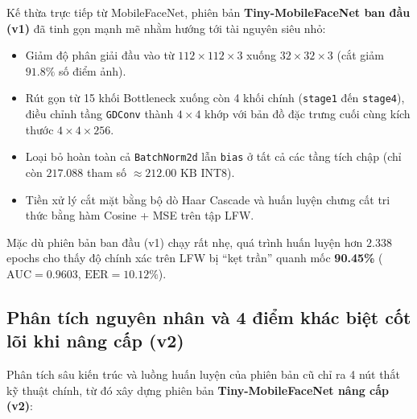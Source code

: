 \documentclass[11pt,a4paper]{article}
\begin{document}
Kế thừa trực tiếp từ MobileFaceNet, phiên bản \textbf{Tiny-MobileFaceNet ban đầu (v1)} đã tinh gọn mạnh mẽ nhằm hướng tới tài nguyên siêu nhỏ:
\begin{itemize}
    \item Giảm độ phân giải đầu vào từ $112 \times 112 \times 3$ xuống $32 \times 32 \times 3$ (cắt giảm $91.8\%$ số điểm ảnh).
    \item Rút gọn từ 15 khối Bottleneck xuống còn 4 khối chính (\texttt{stage1} đến \texttt{stage4}), điều chỉnh tầng \texttt{GDConv} thành $4 \times 4$ khớp với bản đồ đặc trưng cuối cùng kích thước $4 \times 4 \times 256$.
    \item Loại bỏ hoàn toàn cả \texttt{BatchNorm2d} lẫn \texttt{bias} ở tất cả các tầng tích chập (chỉ còn $217.088$ tham số $\approx 212.00\text{ KB}$ INT8).
    \item Tiền xử lý cắt mặt bằng bộ dò Haar Cascade và huấn luyện chưng cất tri thức bằng hàm Cosine + MSE trên tập LFW.
\end{itemize}

Mặc dù phiên bản ban đầu (v1) chạy rất nhẹ, quá trình huấn luyện hơn $2.338$ epochs cho thấy độ chính xác trên LFW bị ``kẹt trần'' quanh mốc \textbf{90.45\%} ($\text{AUC} = 0.9603$, $\text{EER} = 10.12\%$).

\subsection{Phân tích nguyên nhân và 4 điểm khác biệt cốt lõi khi nâng cấp (v2)}
Phân tích sâu kiến trúc và luồng huấn luyện của phiên bản cũ chỉ ra 4 nút thắt kỹ thuật chính, từ đó xây dựng phiên bản \textbf{Tiny-MobileFaceNet nâng cấp (v2)}:
\end{document}
